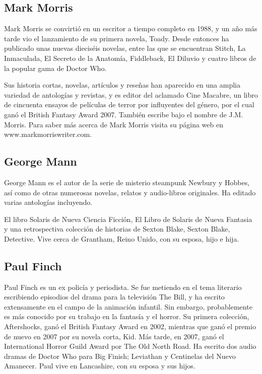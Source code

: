 \subsection*{Mark Morris}

Mark Morris se convirtió en un escritor a tiempo completo en 1988, y un año más tarde vio el lanzamiento de su primera novela, Toady. Desde entonces ha publicado unas nuevas dieciséis novelas, entre las que se encuentran Stitch, La Inmaculada, El Secreto de la Anatomía, Fiddleback, El Diluvio y cuatro libros de la popular gama de Doctor Who.

Sus historia cortas, novelas, artículos y reseñas han aparecido en una amplia variedad de antologías y revistas, y es editor del aclamado Cine Macabre, un libro de cincuenta ensayos de películas de terror por influyentes del género, por el cual ganó el British Fantasy Award 2007. También escribe bajo el nombre de J.M. Morris. Para saber más acerca de Mark Morris visita su página web en www.markmorriswriter.com.

\subsection*{George Mann}

George Mann es el autor de la serie de misterio steampunk Newbury y Hobbes, así como de otras numerosas novelas, relatos y audio-libros originales. Ha editado varias antologías incluyendo.

El libro Solaris de Nueva Ciencia Ficción, El Libro de Solaris de Nueva Fantasia y una retrospectiva colección de historias de Sexton Blake, Sexton Blake, Detective. Vive cerca de Grantham, Reino Unido, con su esposa, hijo e hija.

\subsection*{Paul Finch}

Paul Finch es un ex policía y periodista. Se fue metiendo en el tema literario escribiendo episodios del drama para la televisión The Bill, y ha escrito extensamente en el campo de la animación infantil. Sin embargo, probablemente es más conocido por su trabajo en la fantasía y el horror. Su primera colección, Aftershocks, ganó el British Fantasy Award en 2002, mientras que ganó el premio de nuevo en 2007 por su novela corta, Kid. Más tarde, en 2007, ganó el International Horror Guild Award por The Old North Road. Ha escrito dos audio dramas de Doctor Who para Big Finish; Leviathan y Centinelas del Nuevo Amanecer. Paul vive en Lancashire, con su esposa y sus hijos.

